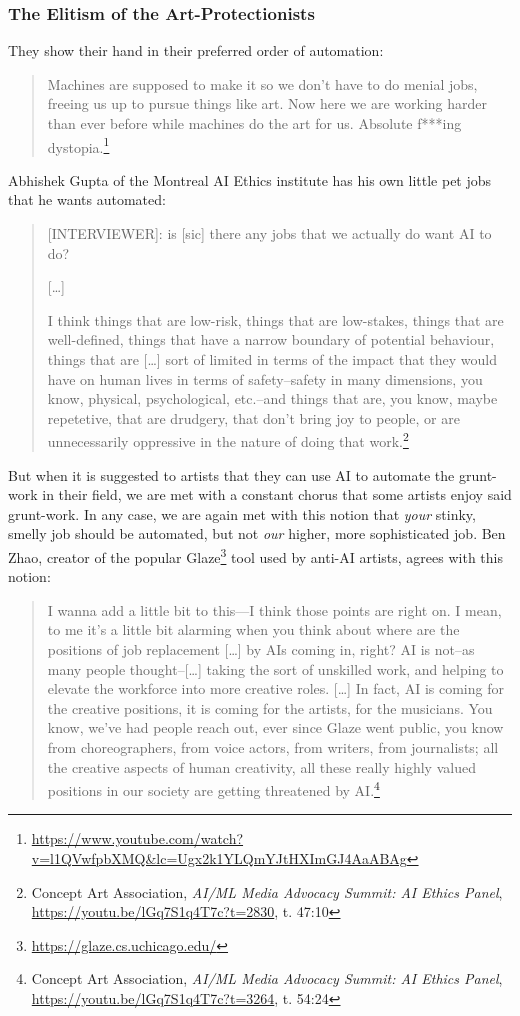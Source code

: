 \documentclass[11pt]{article}
\begin{document}
\subsubsection*{The Elitism of the Art-Protectionists}
\label{sec:orgc308bd4}
They show their hand in their preferred order of automation:
\begin{quote}
Machines are supposed to make it so we don't have to do menial jobs, freeing us up to pursue things like art. Now here we are working harder than ever before while machines do the art for us. Absolute f***ing dystopia.\footnote{\url{https://www.youtube.com/watch?v=l1QVwfpbXMQ\&lc=Ugx2k1YLQmYJtHXImGJ4AaABAg}}
\end{quote}

Abhishek Gupta of the Montreal AI Ethics institute has his own little pet jobs that he wants automated:
\begin{quote}
[INTERVIEWER]: is [sic] there any jobs that we actually do want AI to do?

[\ldots{}]

I think things that are low-risk, things that are low-stakes, things that are well-defined, things that have a narrow boundary of potential behaviour, things that are [\ldots{}] sort of limited in terms of the impact that they would have on human lives in terms of safety--safety in many dimensions, you know, physical, psychological, etc.--and things that are, you know, maybe repetetive, that are drudgery, that don't bring joy to people, or are unnecessarily oppressive in the nature of doing that work.\footnote{Concept Art Association, \emph{AI/ML Media Advocacy Summit: AI Ethics Panel}, \url{https://youtu.be/lGq7S1q4T7c?t=2830}, t. 47:10}
\end{quote}

But when it is suggested to artists that they can use AI to automate the grunt-work in their field, we are met with a constant chorus that some artists enjoy said grunt-work. In any case, we are again met with this notion that \emph{your} stinky, smelly job should be automated, but not \emph{our} higher, more sophisticated job. Ben Zhao, creator of the popular Glaze\footnote{\url{https://glaze.cs.uchicago.edu/}} tool used by anti-AI artists, agrees with this notion:
\begin{quote}
I wanna add a little bit to this---I think those points are right on. I mean, to me it's a little bit alarming when you think about where are the positions of job replacement [\ldots{}] by AIs coming in, right? AI is not--as many people thought--[\ldots{}] taking the sort of unskilled work, and helping to elevate the workforce into more creative roles. [\ldots{}] In fact, AI is coming for the creative positions, it is coming for the artists, for the musicians. You know, we've had people reach out, ever since Glaze went public, you know from choreographers, from voice actors, from writers, from journalists; all the creative aspects of human creativity, all these really highly valued positions in our society are getting threatened by AI.\footnote{Concept Art Association, \emph{AI/ML Media Advocacy Summit: AI Ethics Panel}, \url{https://youtu.be/lGq7S1q4T7c?t=3264}, t. 54:24}
\end{quote}
\end{document}
